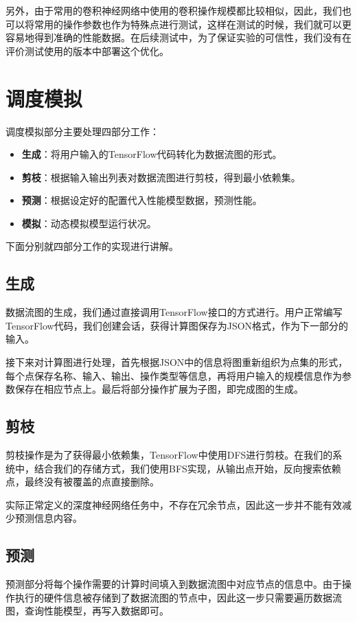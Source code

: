     另外，由于常用的卷积神经网络中使用的卷积操作规模都比较相似，因此，我们也可以将常用的操作参数也作为特殊点进行测试，这样在测试的时候，我们就可以更容易地得到准确的性能数据。在后续测试中，为了保证实验的可信性，我们没有在评价测试使用的版本中部署这个优化。

\section{调度模拟}
    调度模拟部分主要处理四部分工作：
    \begin{itemize}
        \setlength{\itemindent}{1em}
        \item {\bfseries 生成}：将用户输入的TensorFlow代码转化为数据流图的形式。
        \item {\bfseries 剪枝}：根据输入输出列表对数据流图进行剪枝，得到最小依赖集。
        \item {\bfseries 预测}：根据设定好的配置代入性能模型数据，预测性能。
        \item {\bfseries 模拟}：动态模拟模型运行状况。
    \end{itemize}
    
    下面分别就四部分工作的实现进行讲解。

\subsection{生成}
    数据流图的生成，我们通过直接调用TensorFlow接口的方式进行。用户正常编写TensorFlow代码，我们创建会话，获得计算图保存为JSON格式，作为下一部分的输入。

    接下来对计算图进行处理，首先根据JSON中的信息将图重新组织为点集的形式，每个点保存名称、输入、输出、操作类型等信息，再将用户输入的规模信息作为参数保存在相应节点上。最后将部分操作扩展为子图，即完成图的生成。

\subsection{剪枝}
    剪枝操作是为了获得最小依赖集，TensorFlow中使用DFS进行剪枝。在我们的系统中，结合我们的存储方式，我们使用BFS实现，从输出点开始，反向搜索依赖点，最终没有被覆盖的点直接删除。

    实际正常定义的深度神经网络任务中，不存在冗余节点，因此这一步并不能有效减少预测信息内容。

\subsection{预测}
    预测部分将每个操作需要的计算时间填入到数据流图中对应节点的信息中。由于操作执行的硬件信息被存储到了数据流图的节点中，因此这一步只需要遍历数据流图，查询性能模型，再写入数据即可。

